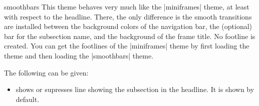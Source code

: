 \begin{layoutthemeexample}{smoothbars}
  This theme behaves very much like the |miniframes| theme, at least
  with respect to the headline. There, the only difference is the
  smooth transitions are installed between the background colors of
  the navigation bar, the (optional) bar for the subsection name, and
  the background of the frame title. No footline is created. You can
  get the footlines of the |miniframes| theme by first loading the
  theme and then loading the |smoothbars| theme.

  The following  can be given:
  \begin{itemize}
  \item {} shows or supresses
    line showing the subsection in the headline. It is shown by
    default.
  \end{itemize}  
\end{layoutthemeexample}

